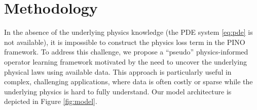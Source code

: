 \section{Methodology}
In the absence of the underlying physics knowledge (\ie the PDE system \eqref{eq:pde} is not available), it is impossible to construct the physics loss term in the PINO framework.
To address this challenge, we propose a ``pseudo'' physics-informed operator learning framework motivated by the need to uncover the underlying physical laws using available data. This approach is particularly useful in complex, challenging applications, where data is often costly or sparse while the underlying physics is hard to fully understand. 	
Our model architecture is depicted in Figure \ref{fig:model}.


% 



